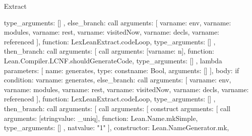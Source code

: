 \begin{lexlean}{Extract}
\begin{toolingmodule}
{{{{{{{{{{                          type_arguments: []
                        },
                        else_branch: call{
                          arguments: [
                            var{name: env},
                            var{name: modules},
                            var{name: rest},
                            var{name: visitedNow},
                            var{name: decls},
                            var{name: referenced}
                          ],
                          function: LexLeanExtract.codeLoop,
                          type_arguments: []
                        },
                        then_branch: call{
                          arguments: [
                            call{
                              arguments: [var{name: n}],
                              function: Lean.Compiler.LCNF.shouldGenerateCode,
                              type_arguments: []
                            },
                            lambda{
                              parameters: [
                                {name: generates, type: const{name: Bool, arguments: []}}
                              ],
                              body: if{
                                condition: var{name: generates},
                                else_branch: call{
                                  arguments: [
                                    var{name: env},
                                    var{name: modules},
                                    var{name: rest},
                                    var{name: visitedNow},
                                    var{name: decls},
                                    var{name: referenced}
                                  ],
                                  function: LexLeanExtract.codeLoop,
                                  type_arguments: []
                                },
                                then_branch: call{
                                  arguments: [
                                    call{
                                      arguments: [
                                        construct{
                                          arguments: [
                                            call{
                                              arguments: [string{value: _uniq}],
                                              function: Lean.Name.mkSimple,
                                              type_arguments: []
                                            },
                                            nat{value: "1"}
                                          ],
                                          constructor: Lean.NameGenerator.mk,
}}}}}}}}}}}}}}}
\end{toolingmodule}
\end{lexlean}
